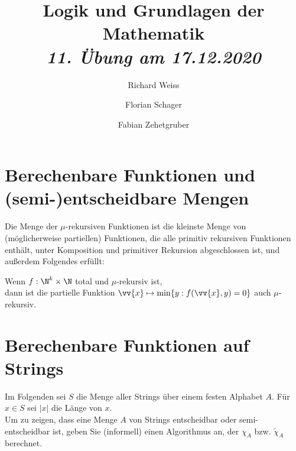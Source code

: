 \documentclass{article}
\title
{
  Logik und Grundlagen der Mathematik \\
  \vspace{4pt}
  \normalsize
  \textit{11. Übung am 17.12.2020}
}
\author
{
  Richard Weiss
  \and
  Florian Schager
  \and
  Fabian Zehetgruber
}
\date{}
\begin{document}
\maketitle

\section*{Berechenbare Funktionen und (semi-)entscheidbare Mengen}

Die Menge der $\mu$-rekursiven Funktionen ist die kleinste Menge von (möglicherweise partiellen)
Funktionen, die alle primitiv rekursiven Funktionen enthält, unter Komposition und
primitiver Rekursion abgeschlossen ist, und außerdem Folgendes erfüllt:

\begin{adjustwidth}{1cm}{}
Wenn $f: \N^k \times \N$ total und $\mu$-rekursiv ist, \\
dann ist die partielle Funktion $\vv{x} \mapsto \min\{y: f(\vv{x},y) = 0\}$ auch
$\mu$-rekursiv.
\end{adjustwidth}




\section*{Berechenbare Funktionen auf Strings}

Im Folgenden sei $S$ die Menge aller Strings über einem festen Alphabet $A$.
Für $x \in S$ sei $|x|$ die Länge von $x$. \\
Um zu zeigen, dass eine Menge $A$ von Strings entscheidbar oder semi-entscheidbar
ist, geben Sie (informell) einen Algorithmus an, der $\chi_A$ bzw. $\tilde{\chi}_A$
berechnet.







\end{document}
